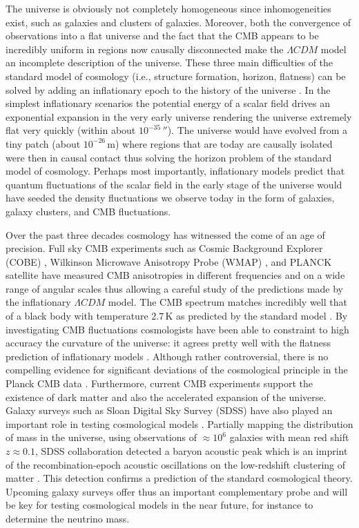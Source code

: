 The universe is obviously not completely homogeneous since inhomogeneities exist, such as galaxies and clusters of galaxies. Moreover, both the convergence of observations into a flat universe and the fact that the CMB appears to be incredibly uniform in regions now causally disconnected  make the $\Lambda CDM$ model an incomplete description of the universe. These three main difficulties of the standard model of cosmology (i.e., structure formation, horizon, flatness) can be solved by adding an inflationary epoch to the history of the universe \cite{Guth:2005zr}. In the simplest inflationary scenarios the potential energy of a scalar field drives an exponential expansion in the very early universe rendering the universe extremely flat very quickly (within about $10^{-35}\, \second$). The universe would have evolved from a tiny patch (about $10^{-26}\,\mathrm{m}$) where regions that are today are causally isolated were then in causal contact thus solving the horizon problem of the standard model of cosmology. Perhaps most importantly, inflationary models predict that quantum fluctuations of the scalar field in the early stage of the universe would have seeded the density fluctuations we observe today in the form of galaxies, galaxy clusters, and CMB fluctuations.

Over the past three decades cosmology has witnessed the come of an age of precision. Full sky CMB experiments such as Cosmic Background Explorer (COBE) \cite{Smoot:1992td}, Wilkinson Microwave Anisotropy Probe (WMAP) \cite{Bennett:2003bz}, and PLANCK satellite \cite{Ade:2013sjv} have measured CMB anisotropies in different frequencies and on a wide range of angular scales thus allowing a careful study of the predictions made by the inflationary $\Lambda CDM$ model. The CMB spectrum matches incredibly well that of a black body with temperature $2.7\,\mathrm{K}$ as predicted by the standard model \cite{Alpher:1950zz}. By investigating CMB fluctuations cosmologists have been able to constraint to high accuracy the curvature of the universe: it agrees pretty well with the flatness prediction of inflationary models \cite{Ade:2015xua}. Although rather controversial, there is no compelling evidence for significant deviations of the cosmological principle in the Planck CMB data \cite{Ade:2015hxq}. Furthermore, current CMB experiments support the existence of dark matter and also the accelerated expansion of the universe. Galaxy surveys such as Sloan Digital Sky Survey (SDSS) have also played an important role in testing cosmological models \cite{Tegmark:2003uf,Tegmark:2003ud}. Partially mapping the distribution of mass in the universe, using observations of $\approx 10^6$ galaxies with mean red shift $z \approx 0.1$, SDSS collaboration detected a baryon acoustic peak which is an imprint of the recombination-epoch acoustic oscillations on the low-redshift clustering of matter \cite{Eisenstein:2005su}. This detection confirms a prediction of the standard cosmological theory. Upcoming galaxy surveys offer thus an important complementary probe and will be key for testing cosmological models in the near future, for instance to determine the neutrino mass.

